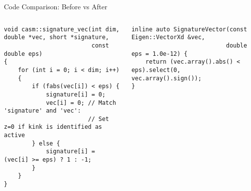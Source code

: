 \documentclass[aspectratio=169]{beamer}
\begin{document}
\begin{frame}[fragile]{Code Comparison: Before vs After}
    \begin{columns}[T]
        \begin{column}{0.48\textwidth}
            \begin{block}{}
                \tiny
                \begin{verbatim}
void casm::signature_vec(int dim, double *vec, short *signature,
                         const double eps)
{
    for (int i = 0; i < dim; i++)
    {
        if (fabs(vec[i]) < eps) {
            signature[i] = 0;
            vec[i] = 0; // Match 'signature' and 'vec':
                        // Set z=0 if kink is identified as active
        } else {
            signature[i] = (vec[i] >= eps) ? 1 : -1;
        }
    }
}
                \end{verbatim}
            \end{block}
        \end{column}

        \begin{column}{0.48\textwidth}
            \begin{block}{}
                \tiny
                \begin{verbatim}
inline auto SignatureVector(const Eigen::VectorXd &vec,
                           double eps = 1.0e-12) {
    return (vec.array().abs() < eps).select(0, vec.array().sign());
}
                \end{verbatim}
            \end{block}
        \end{column}
    \end{columns}
\end{frame}
\end{document}
